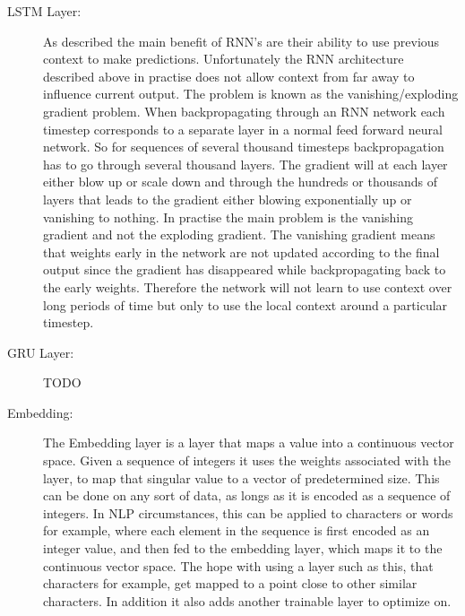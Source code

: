 \begin{description}

    \item[\gls{LSTM} Layer:] As described the main benefit of \gls{RNN}'s are
        their ability to use previous context to make predictions. Unfortunately
        the \gls{RNN} architecture described above in practise does not allow
        context from far away to influence current output. The problem is known
        as the vanishing/exploding gradient problem. When backpropagating
        through an \gls{RNN} network each timestep corresponds to a separate
        layer in a normal feed forward neural network. So for sequences of
        several thousand timesteps backpropagation has to go through several
        thousand layers. The gradient will at each layer either blow up or scale
        down and through the hundreds or thousands of layers that leads to the
        gradient either blowing exponentially up or vanishing to nothing. In
        practise the main problem is the vanishing gradient and not the
        exploding gradient. The vanishing gradient means that weights early in
        the network are not updated according to the final output since the
        gradient has disappeared while backpropagating back to the early
        weights. Therefore the network will not learn to use context over long
        periods of time but only to use the local context around a particular
        timestep.

    \item[\gls{GRU} Layer:] TODO

    \item[Embedding:] The Embedding layer is a layer that maps a value into a
        continuous vector space. Given a sequence of integers it uses the
        weights associated with the layer, to map that singular value to a
        vector of predetermined size. This can be done on any sort of data, as
        longs as it is encoded as a sequence of integers. In \gls{NLP}
        circumstances, this can be applied to characters or words for example,
        where each element in the sequence is first encoded as an integer value,
        and then fed to the embedding layer, which maps it to the continuous
        vector space. The hope with using a layer such as this, that characters
        for example, get mapped to a point close to other similar characters. In
        addition it also adds another trainable layer to optimize on.


\end{description}
